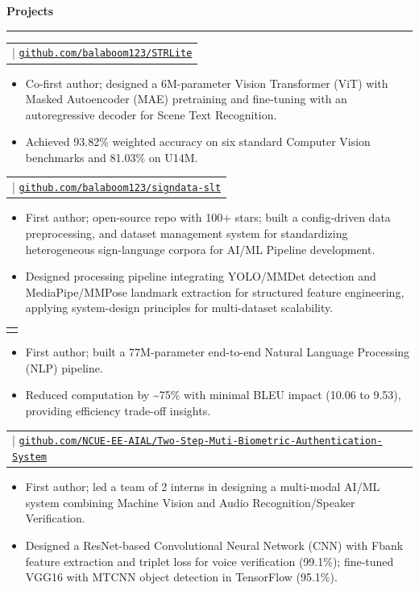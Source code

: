 \documentclass[10pt,a4paper]{article}
\makeatletter
\newcommand{\plainlink}[1]{\uline{\nolinkurl{#1}}}
\newcommand{\sectiontitle}[1]{%
  \vspace{5pt}
  {\large\textbf{#1}}\par
  \vspace{1.5pt}
  \hrule
  \vspace{2pt}
}
\newcommand{\projectentry}[2]{%
  \begin{tabularx}{\textwidth}{@{}>{\raggedright\arraybackslash}X@{}}
    {\small\textbf{#1}} \;|\; {\scriptsize #2}
  \end{tabularx}
  \par
}
\newcommand{\projectentrynolink}[1]{%
  \begin{tabularx}{\textwidth}{@{}>{\raggedright\arraybackslash}X@{}}
    {\small\textbf{#1}}
  \end{tabularx}
  \par
}
\makeatother
\begin{document}
\sectiontitle{Projects}
\projectentry
  {STRLite: Lightweight Masked Autoencoders for Adaptable Scene Text Recognition}
  {\plainlink{github.com/balaboom123/STRLite}}
\begin{itemize}
  \item Co-first author; designed a 6M-parameter Vision Transformer (ViT) with Masked Autoencoder (MAE) pretraining and fine-tuning with an autoregressive decoder for Scene Text Recognition.
  \item Achieved 93.82\% weighted accuracy on six standard Computer Vision benchmarks and 81.03\% on U14M.
\end{itemize}
\vspace{3pt}
\projectentry
  {SignDATA: Data Pipeline for Sign Language Translation}
  {\plainlink{github.com/balaboom123/signdata-slt}}
\begin{itemize}
  \item First author; open-source repo with 100+ stars; built a config-driven data preprocessing, and dataset management system for standardizing heterogeneous sign-language corpora for AI/ML Pipeline development.
  \item Designed processing pipeline integrating YOLO/MMDet detection and MediaPipe/MMPose landmark extraction for structured feature engineering, applying system-design principles for multi-dataset scalability.
\end{itemize}
\vspace{3pt}
\projectentrynolink
  {Towards Compact Sign Language Translation: Frame Rate and Model Size Trade-offs}
\begin{itemize}
  \item First author; built a 77M-parameter end-to-end Natural Language Processing (NLP) pipeline.
  \item Reduced computation by {\textasciitilde}75\% with minimal BLEU impact (10.06 to 9.53), providing efficiency trade-off insights.
\end{itemize}
\vspace{3pt}
\projectentry
  {Two-step Authentication: Multi-biometric System Using Voice and Facial Recognition}
  {\plainlink{github.com/NCUE-EE-AIAL/Two-Step-Muti-Biometric-Authentication-System}}
\begin{itemize}
  \item First author; led a team of 2 interns in designing a multi-modal AI/ML system combining Machine Vision and Audio Recognition/Speaker Verification.
  \item Designed a ResNet-based Convolutional Neural Network (CNN) with Fbank feature extraction and triplet loss for voice verification (99.1\%); fine-tuned VGG16 with MTCNN object detection in TensorFlow (95.1\%).
\end{itemize}
\end{document}
